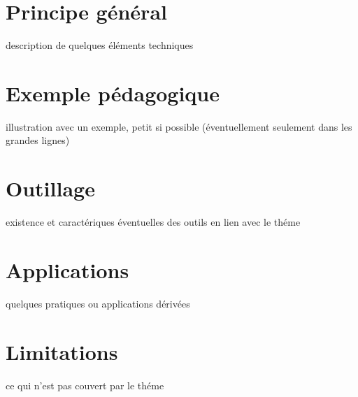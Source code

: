 \documentclass[french]{report}
\begin{document}
\section{Principe général}

description de quelques éléments techniques

\section{Exemple pédagogique}

illustration avec un exemple, petit si possible  (éventuellement seulement dans les grandes lignes)

\section{Outillage}

existence et caractériques éventuelles des outils en lien avec le théme

\section{Applications}

quelques pratiques ou applications dérivées

\section{Limitations}

ce qui n'est pas couvert par le théme
\end{document}
